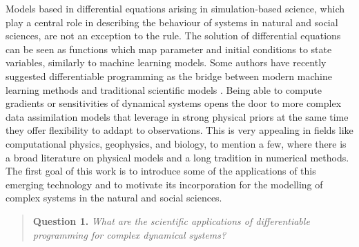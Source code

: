 Models based in differential equations arising in simulation-based science, which play a central role in describing the behaviour of systems in natural and social sciences, are not an exception to the rule\cite{Ghattas.2021}.
The solution of differential equations can be seen as functions which map parameter and initial conditions to state variables, similarly to machine learning models.
Some authors have recently suggested differentiable programming as the bridge between modern machine learning methods and traditional scientific models \cite{Ramsundar_Krishnamurthy_Viswanathan_2021, Shen_diff_modelling, Gelbrecht-differential-programming-Earth}. 
Being able to compute gradients or sensitivities of dynamical systems opens the door to more complex data assimilation models that leverage in strong physical priors at the same time they offer flexibility to addapt to observations.
This is very appealing in fields like computational physics, geophysics, and biology, to mention a few, where there is a broad literature on physical models and a long tradition in numerical methods. 
The first goal of this work is to introduce some of the applications of this emerging technology and to motivate its incorporation for the modelling of complex systems in the natural and social sciences. 
\begin{quote}
    \textbf{Question 1. }
    \textit{What are the scientific applications of differentiable programming for complex dynamical systems?}
\end{quote}

